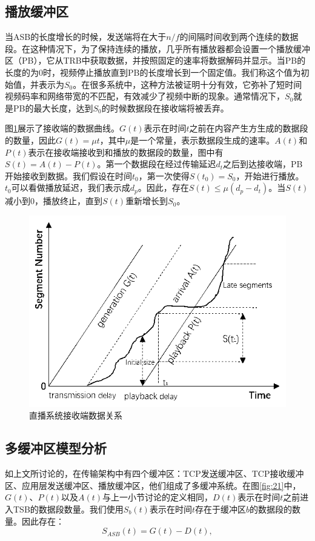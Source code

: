 \subsection{播放缓冲区}

当ASB的长度增长的时候，发送端将在大于$n/f$的间隔时间收到两个连续的数据段。在这种情况下，为了保持连续的播放，几乎所有播放器都会设置一个播放缓冲区（PB），它从TRB中获取数据，并按照固定的速率将数据解码并显示。当PB的长度的为0时，视频停止播放直到PB的长度增长到一个固定值。我们称这个值为初始值，并表示为$S_0$。在很多系统中，这种方法被证明十分有效，它弥补了短时间视频码率和网络带宽的不匹配，有效减少了视频中断的现象。通常情况下，$S_0$就是PB的最大长度，达到$S_0$的时候数据段在接收端将被丢弃。

图\ref{fig:20}展示了接收端的数据曲线。$G(t)$表示在时间$t$之前在内容产生方生成的数据段的数量，因此$G(t) = \mu t$，其中$\mu$是一个常量，表示数据段生成的速率。$A(t)$和$P(t)$表示在接收端接收到和播放的数据段的数量，图中有$S(t) = A(t) - P(t)$。第一个数据段在经过传输延迟$d_t$之后到达接收端，PB开始接收到数据。我们假设在时间$t_0$，第一次使得$S(t_0)=S_0$，开始进行播放。$t_0$可以看做播放延迟，我们表示成$d_p$。因此，存在$S(t) \le \mu (d_p - d_t)$。当$S(t)$减小到$0$，播放终止，直到$S(t)$重新增长到$S_0$。

\begin{figure}[t]
	\centering
	\includegraphics[width = 0.8\linewidth]{clip/20.png}
	\caption{直播系统接收端数据关系\label{fig:20}}
\end{figure}

\subsection{多缓冲区模型分析}

如上文所讨论的，在传输架构中有四个缓冲区：TCP发送缓冲区、TCP接收缓冲区、应用层发送缓冲区、播放缓冲区，他们组成了多缓冲系统。在图\ref{fig:21}中，$G(t)$、$P(t)$以及$A(t)$与上一小节讨论的定义相同，$D(t)$表示在时间$t$之前进入TSB的数据段数量。我们使用$S_b(t)$表示在时间$t$存在于缓冲区$b$的数据段的数量。因此存在：
\begin{equation}
\label{eq:mm-1}
S_{ASB}(t)=G(t)-D(t),
\end{equation}


